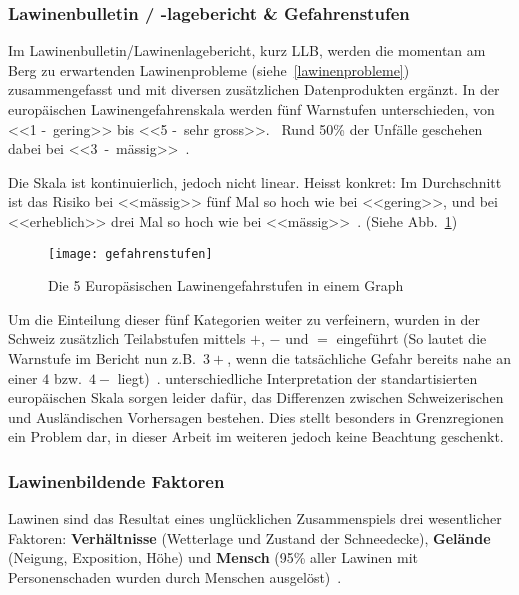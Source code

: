 \begin{multicols}{2}
\subsubsection{Lawinenbulletin / -lagebericht \& Gefahrenstufen}

Im Lawinenbulletin/Lawinenlagebericht, kurz LLB, werden die momentan am Berg zu erwartenden Lawinenprobleme (siehe~\ref{lawinenprobleme}) zusammengefasst und mit diversen zusätzlichen Datenprodukten ergänzt.
In der europäischen Lawinengefahrenskala werden fünf Warnstufen unterschieden, von <<1 -~gering>> bis <<5 -~sehr gross>>.~\cite{lawinengefskala} 
Rund 50\% der Unfälle geschehen dabei bei <<3~-~mässig>>~\cite{achtunglawine}.

Die Skala ist kontinuierlich, jedoch nicht linear. Heisst konkret: 
Im Durchschnitt ist das Risiko bei <<mässig>> fünf Mal so hoch wie bei <<gering>>, und bei <<erheblich>> drei Mal so hoch wie bei <<mässig>>~\cite{sacbergspwinter}. (Siehe Abb.\ \ref{fig:llbdanger})

\begin{figure}[H]
  \centering
  \texttt{[image: gefahrenstufen]}
  \caption{Die 5 Europäsischen Lawinengefahrstufen in einem Graph}\label{fig:llbdanger}
\end{figure}

Um die Einteilung dieser fünf Kategorien weiter zu verfeinern, wurden in der Schweiz zusätzlich Teilabstufen mittels $+$, $-$ und $=$ eingeführt (So lautet die Warnstufe im Bericht nun z.B.\ $3+$, wenn die tatsächliche Gefahr bereits nahe an einer $4$ bzw.\ $4-$ liegt)~\cite{sacbergspwinter}.
unterschiedliche Interpretation der standartisierten europäischen Skala sorgen leider dafür, das Differenzen zwischen Schweizerischen und Ausländischen Vorhersagen bestehen. Dies stellt besonders in Grenzregionen ein Problem dar, in dieser Arbeit im weiteren jedoch keine Beachtung geschenkt.


\subsubsection{Lawinenbildende Faktoren}

Lawinen sind das Resultat eines unglücklichen Zusammenspiels drei wesentlicher Faktoren: 
\textbf{Verhältnisse} (Wetterlage und Zustand der Schneedecke), \textbf{Gelände} (Neigung, Exposition, Höhe) und \textbf{Mensch} (95\% aller Lawinen mit Personenschaden wurden durch Menschen ausgelöst)~\cite{ortovoxlabsnow}.


\end{multicols}
